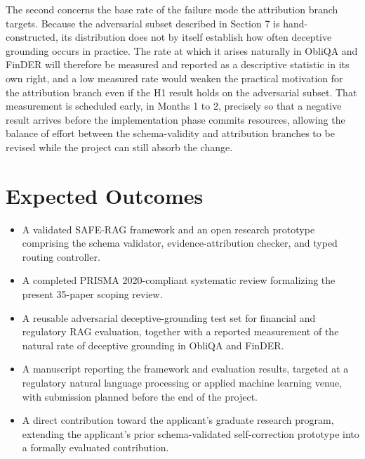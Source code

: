 \documentclass[11pt,a4paper]{article}
\begin{document}
The second concerns the base rate of the failure mode the attribution branch targets.
Because the adversarial subset described in Section 7 is hand-constructed, its
distribution does not by itself establish how often deceptive grounding occurs in
practice. The rate at which it arises naturally in ObliQA and FinDER will therefore be
measured and reported as a descriptive statistic in its own right, and a low measured rate
would weaken the practical motivation for the attribution branch even if the H1 result
holds on the adversarial subset. That measurement is scheduled early, in Months 1 to 2,
precisely so that a negative result arrives before the implementation phase commits
resources, allowing the balance of effort between the schema-validity and attribution
branches to be revised while the project can still absorb the change.

\section{Expected Outcomes}

\begin{itemize}
\item A validated SAFE-RAG framework and an open research prototype comprising the schema
validator, evidence-attribution checker, and typed routing controller.

\item A completed PRISMA 2020-compliant systematic review formalizing the present
35-paper scoping review.

\item A reusable adversarial deceptive-grounding test set for financial and regulatory RAG
evaluation, together with a reported measurement of the natural rate of deceptive
grounding in ObliQA and FinDER.

\item A manuscript reporting the framework and evaluation results, targeted at a
regulatory natural language processing or applied machine learning venue, with submission
planned before the end of the project.

\item A direct contribution toward the applicant's graduate research program, extending
the applicant's prior schema-validated self-correction prototype into a formally evaluated
contribution.
\end{itemize}

\end{document}
